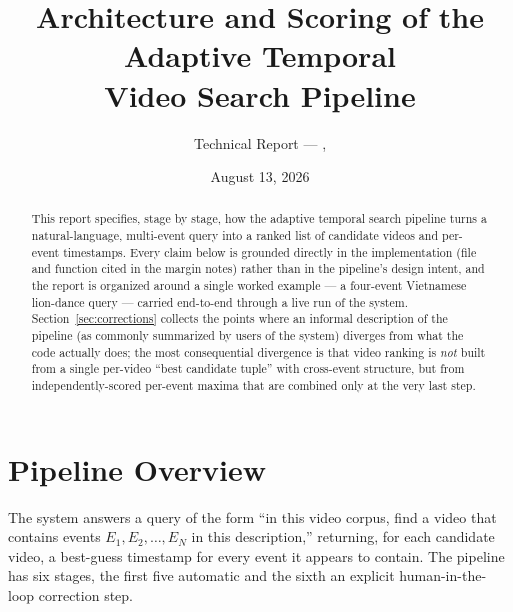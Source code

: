 \documentclass[11pt]{article}
\title{\bfseries Architecture and Scoring of the Adaptive Temporal\\ Video Search Pipeline}
\author{Technical Report --- \file{src/adaptive\_search}, \file{src/rewrite}}
\date{August 13, 2026}
\begin{document}
\maketitle

\begin{abstract}
\noindent
This report specifies, stage by stage, how the adaptive temporal search pipeline
turns a natural-language, multi-event query into a ranked list of candidate
videos and per-event timestamps. Every claim below is grounded directly in the
implementation (file and function cited in the margin notes) rather than in
the pipeline's design intent, and the report is organized around a single
worked example --- a four-event Vietnamese lion-dance query --- carried
end-to-end through a live run of the system. Section~\ref{sec:corrections}
collects the points where an informal description of the pipeline (as
commonly summarized by users of the system) diverges from what the code
actually does; the most consequential divergence is that video ranking is
\emph{not} built from a single per-video ``best candidate tuple'' with
cross-event structure, but from independently-scored per-event maxima that
are combined only at the very last step.
\end{abstract}

\tableofcontents

\section{Pipeline Overview}

The system answers a query of the form ``in this video corpus, find a video
that contains events $E_1, E_2, \dots, E_N$ in this description,'' returning,
for each candidate video, a best-guess timestamp for every event it appears to
contain. The pipeline has six stages, the first five automatic and the sixth
an explicit human-in-the-loop correction step.
\end{document}
